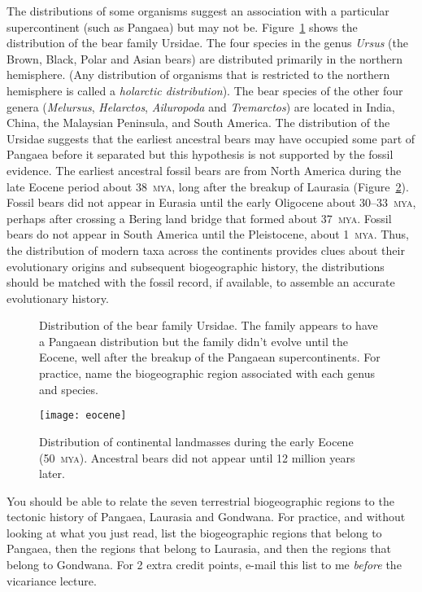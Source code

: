 \documentclass[11pt, hidelinks]{article}
\newcommand{\MYA}{\textsc{mya}}
\begin{document}
The distributions of some organisms suggest an association with a particular supercontinent (such as Pangaea) but may not be. Figure~\ref{Bear Distribution} shows the distribution of the bear family Ursidae.  The four species in the genus \emph{Ursus} (the Brown, Black, Polar and Asian bears) are distributed primarily in the northern hemisphere. (Any distribution of organisms that is restricted to the northern hemisphere is called a \emph{holarctic distribution}).  The bear species of the other four genera (\emph{Melursus}, \emph{Helarctos}, \emph{Ailuropoda} and \emph{Tremarctos}) are located in India, China, the Malaysian Peninsula, and South America. The distribution of the Ursidae suggests that the earliest ancestral bears may have occupied some part of Pangaea before it separated but this hypothesis is not supported by the fossil evidence. The earliest ancestral fossil bears are from North America during the late Eocene period about 38~\MYA, long after the breakup of Laurasia (Figure~\ref{Eocene Map}). Fossil bears did not appear in Eurasia until the early Oligocene about 30--33~\MYA, perhaps after crossing a Bering land bridge that formed about 37~\MYA.  Fossil bears do not appear in South America until the Pleistocene, about 1~\MYA.  Thus, the distribution of modern taxa across the continents provides clues about their evolutionary origins and subsequent biogeographic history, the distributions should be matched with the fossil record, if available, to assemble an accurate evolutionary history.  

\begin{figure}[tb]
	\centering
		\caption{Distribution of the bear family Ursidae. The family appears to have a Pangaean distribution but the family didn't evolve until the Eocene, well after the breakup of the Pangaean supercontinents. For practice, name the biogeographic region associated with each genus and species.\label{Bear Distribution}}
		
\end{figure}

\begin{figure}[tb]
	\centering
		\texttt{[image: eocene]}  
		\caption{Distribution of continental landmasses during the early Eocene (50~\MYA). Ancestral bears did not appear until 12 million years later.\label{Eocene Map}}
		
\end{figure}


You should be able to relate the seven terrestrial biogeographic regions to the tectonic history of Pangaea, Laurasia and Gondwana. For practice, and without looking at what you just read, list the biogeographic regions that belong to Pangaea, then the regions that belong to Laurasia, and then the regions that belong to Gondwana. For 2 extra credit points, e-mail this list to me \emph{before} the vicariance lecture.
\end{document}
